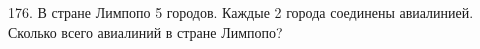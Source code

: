 176. В стране Лимпопо 5 городов. Каждые 2 города соединены авиалинией. Сколько всего авиалиний в стране Лимпопо?\\
